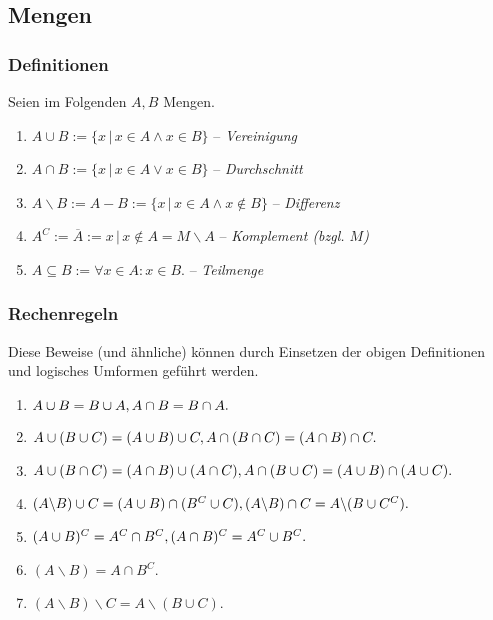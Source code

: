 \documentclass[a4paper, 9pt, DIV=24]{scrartcl}
\begin{document}
\subsection{Mengen}
\subsubsection{Definitionen}
Seien im Folgenden $A, B$ Mengen.
\begin{enumerate}[label={(}\arabic*{)}]
 \item $A \cup B := \{x\, |\, x \in A \wedge x \in B\}$ -- \emph{Vereinigung}
 \item $A \cap B := \{x\, |\, x \in A \vee x \in B\}$ -- \emph{Durchschnitt}
 \item $A \backslash B := A - B := \{x\, |\, x \in A \wedge x \notin B\}$ -- \emph{Differenz}
 \item $A^C := \overline{A} := {x\, |\, x \notin A} = M \backslash A$ -- \emph{Komplement (bzgl. $M$)}
 \item $A \subseteq B := \forall x \in A: x \in B.$ -- \emph{Teilmenge}
\end{enumerate}
\subsubsection{Rechenregeln}
Diese Beweise (und ähnliche) können durch Einsetzen der obigen Definitionen und logisches Umformen geführt werden.
\begin{enumerate}[label={(}\arabic*{)}]
 \item $A \cup B = B \cup A, \\ A \cap B = B \cap A.$
 \item $A \cup (B \cup C) = (A \cup B) \cup C, \\ A \cap (B \cap C) = (A \cap B) \cap C.$
 \item $A \cup (B \cap C) = (A \cap B) \cup (A \cap C), \\ A \cap (B \cup C) = (A \cup B) \cap (A \cup C).$
 \item $(A\backslash B) \cup C = (A \cup B) \cap (B^C \cup C), \\ (A\backslash B) \cap C = A \backslash (B \cup C^C).$
 \item $(A \cup B)^C = A^C \cap B^C, \\ (A \cap B)^C = A^C \cup B^C.$
 \item $(A\backslash B) = A \cap B^C.$
 \item $(A\backslash B) \backslash C = A \backslash (B \cup C).$
\end{enumerate}
\end{document}

